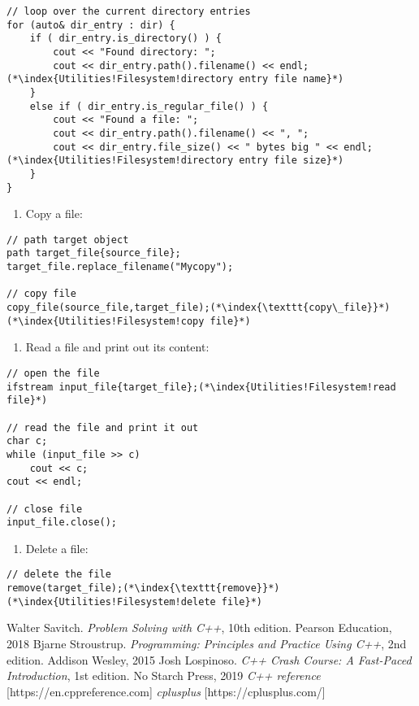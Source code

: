 \documentclass[10pt]{article}
\begin{document}
\begin{lstlisting}    
// loop over the current directory entries
for (auto& dir_entry : dir) {
    if ( dir_entry.is_directory() ) {
        cout << "Found directory: ";
        cout << dir_entry.path().filename() << endl;(*\index{Utilities!Filesystem!directory entry file name}*)
    }
    else if ( dir_entry.is_regular_file() ) {
        cout << "Found a file: ";
        cout << dir_entry.path().filename() << ", ";
        cout << dir_entry.file_size() << " bytes big " << endl;(*\index{Utilities!Filesystem!directory entry file size}*)
    }
}
\end{lstlisting}
\begin{enumerate}
\item[] Copy a file:
\end{enumerate}
\begin{lstlisting}
// path target object
path target_file{source_file};
target_file.replace_filename("Mycopy");
    
// copy file
copy_file(source_file,target_file);(*\index{\texttt{copy\_file}}*)(*\index{Utilities!Filesystem!copy file}*)
\end{lstlisting}
\begin{enumerate}
\item[] Read a file and print out its content:
\end{enumerate}
\begin{lstlisting}
// open the file
ifstream input_file{target_file};(*\index{Utilities!Filesystem!read file}*)
    
// read the file and print it out
char c; 
while (input_file >> c)
    cout << c;
cout << endl;
    
// close file
input_file.close();
\end{lstlisting}
\begin{enumerate}
\item[] Delete a file:
\end{enumerate}
\begin{lstlisting}
// delete the file
remove(target_file);(*\index{\texttt{remove}}*)(*\index{Utilities!Filesystem!delete file}*)
\end{lstlisting}
%
%
\small
\begin{thebibliography}{99}
 Walter Savitch. \textsl{Problem Solving with C++}, 10th edition. Pearson Education, 2018
 Bjarne Stroustrup. \textsl{Programming: Principles and Practice Using C++}, 2nd edition. Addison Wesley, 2015
 Josh Lospinoso. \textsl{C++ Crash Course: A Fast-Paced Introduction}, 1st edition. No Starch Press, 2019
 \textsl{C++ reference} [https://en.cppreference.com]
 \textsl{cplusplus} [https://cplusplus.com/]
\end{thebibliography}
%
%
\printindex
\end{document}
